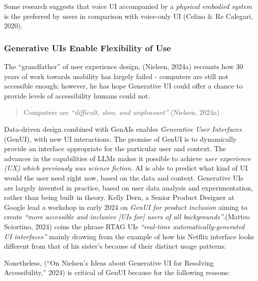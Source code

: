 \documentclass[
  12pt,
  letterpaper,
  DIV=11,
  numbers=noendperiod]{scrartcl}
\begin{document}
Some research suggests that voice UI accompanied by a \emph{physical
embodied system} is the preferred by users in comparison with voice-only
UI (Celino \& Re Calegari, 2020).

\subsubsection{Generative UIs Enable Flexibility of
Use}\label{generative-uis-enable-flexibility-of-use}

The ``grandfather'' of user experience design, (Nielsen, 2024a) recounts
how 30 years of work towards usability has largely failed - computers
are still not accessible enough; however, he has hope Generative UI
could offer a chance to provide levels of accessibility humans could
not.

\begin{quote}
Computers are \emph{``difficult, slow, and unpleasant''} (Nielsen,
2024a)
\end{quote}

Data-driven design combined with GenAIs enables \emph{Generative User
Interfaces} (GenUI), with new UI interactions. The promise of GenUI is
to dynamically provide an interface appropriate for the particular user
and context. The advances in the capabilities of LLMs makes it possible
to achieve \emph{user experience (UX) which previously was science
fiction}. AI is able to predict what kind of UI would the user need
right now, based on the data and context. Generative UIs are largely
invented in practice, based on user data analysis and experimentation,
rather than being built in theory. Kelly Dern, a Senior Product Designer
at Google lead a workshop in early 2024 on \emph{GenUI for product
inclusion} aiming to create \emph{``more accessible and inclusive {[}UIs
for{]} users of all backgrounds''}.(Matteo Sciortino, 2024) coins the
phrase RTAG UIs \emph{``real-time automatically-generated UI
interfaces''} mainly drawing from the example of how his Netflix
interface looks different from that of his sister's because of their
distinct usage patterns.

Nonetheless, ({``On {Nielsen}'s Ideas about Generative {UI} for
Resolving Accessibility,''} 2024) is critical of GenUI because for the
following reasons:

\def\pandoctableshortcapt{Criticism of Generative UI}
\end{document}

